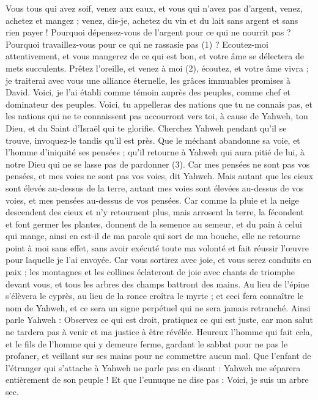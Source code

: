 \begin{multicols}{2}
\VerseOne{}Vous tous qui avez soif, venez aux eaux, et vous qui n'avez pas d'argent, venez, achetez et mangez ; venez, dis-je, achetez du vin et du lait sans argent et sans rien payer !
Pourquoi dépensez-vous de l'argent pour ce qui ne nourrit pas ? Pourquoi travaillez-vous pour ce qui ne rassasie pas (1) ? Ecoutez-moi attentivement, et vous mangerez de ce qui est bon, et votre âme se délectera de mets succulents.
Prêtez l’oreille, et venez à moi (2), écoutez, et votre âme vivra ; je traiterai avec vous une alliance éternelle, les grâces immuables promises à David.
Voici, je l'ai établi comme témoin auprès des peuples, comme chef et dominateur des peuples.
Voici, tu appelleras des nations que tu ne connais pas, et les nations qui ne te connaissent pas accourront vers toi, à cause de Yahweh, ton Dieu, et du Saint d'Israël qui te glorifie.
Cherchez Yahweh pendant qu'il se trouve, invoquez-le tandis qu'il est près.
Que le méchant abandonne sa voie, et l'homme d’iniquité ses pensées ; qu'il retourne à Yahweh qui aura pitié de lui, à notre Dieu qui ne se lasse pas de pardonner (3).
Car mes pensées ne sont pas vos pensées, et mes voies ne sont pas vos voies, dit Yahweh.
Mais autant que les cieux sont élevés au-dessus de la terre, autant mes voies sont élevées au-dessus de vos voies, et mes pensées au-dessus de vos pensées.
Car comme la pluie et la neige descendent des cieux et n'y retournent plus, mais arrosent la terre, la fécondent et font germer les plantes, donnent de la semence au semeur, et du pain à celui qui mange,
ainsi en est-il de ma parole qui sort de ma bouche, elle ne retourne point à moi sans effet, sans avoir exécuté toute ma volonté et fait réussir l’œuvre pour laquelle je l’ai envoyée.
Car vous sortirez avec joie, et vous serez conduits en paix ; les montagnes et les collines éclateront de joie avec chants de triomphe devant vous, et tous les arbres des champs battront des mains.
Au lieu de l’épine s’élèvera le cyprès, au lieu de la ronce croîtra le myrte ; et ceci fera connaître le nom de Yahweh, et ce sera un signe perpétuel qui ne sera jamais retranché.
\VerseOne{}Ainsi parle Yahweh : Observez ce qui est droit, pratiquez ce qui est juste, car mon salut ne tardera pas à venir et ma justice à être révélée.
Heureux l'homme qui fait cela, et le fils de l'homme qui y demeure ferme, gardant le sabbat pour ne pas le profaner, et veillant sur ses mains pour ne commettre aucun mal.
Que l'enfant de l'étranger qui s’attache à Yahweh ne parle pas en disant : Yahweh me séparera entièrement de son peuple ! Et que l'eunuque ne dise pas : Voici, je suis un arbre sec.

\end{multicols}
